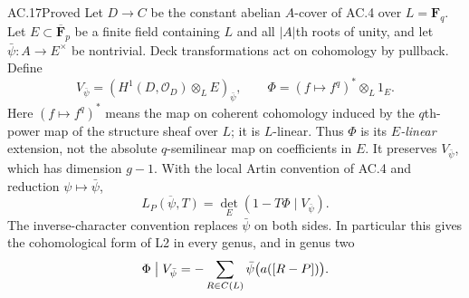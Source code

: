 \begin{claim}{AC.17}{Proved}
Let $D\to C$ be the constant abelian $A$-cover of AC.4 over
$L=\mathbf F_q$.  Let $E\subset\overline{\mathbf F}_p$ be a finite field
containing $L$ and all $|A|$th roots of unity, and let
$\bar\psi:A\to E^\times$ be nontrivial.  Deck transformations act on
cohomology by pullback.  Define
\[
 V_{\bar\psi}=
 \left(H^1(D,\mathcal O_D)\otimes_L E\right)_{\bar\psi},
 \qquad
 \Phi=(f\mapsto f^q)^*\otimes_L 1_E.
\]
Here $(f\mapsto f^q)^*$ means the map on coherent cohomology induced by
the $q$th-power map of the structure sheaf over $L$; it is $L$-linear.
Thus $\Phi$ is its \emph{$E$-linear} extension, not the absolute
$q$-semilinear map on coefficients in $E$.
It preserves $V_{\bar\psi}$, which has dimension $g-1$.  With the local
Artin convention of AC.4 and reduction $\psi\mapsto\bar\psi$,
\[
           \overline{L_P(\psi,T)}
              =\det_E(1-T\Phi\mid V_{\bar\psi}).        \tag{AC.11}
\]
The inverse-character convention replaces $\bar\psi$ on both sides.
In particular this gives the cohomological form of L2 in every genus,
and in genus two
\[
 \Phi\bigm|V_{\bar\psi}
    =-\sum_{R\in C(L)}\bar\psi\bigl(a([R-P])\bigr).
\]
\end{claim}
